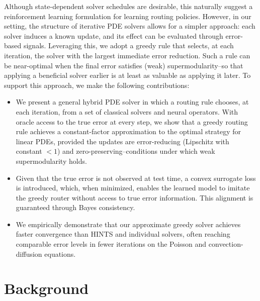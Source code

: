 \documentclass{article}
\newcommand{\ambuj}[1]{\textcolor{red}{AT: #1}}
\begin{document}
Although state-dependent solver schedules are desirable, this naturally suggest a reinforcement learning formulation for learning routing policies. However, in our setting, the structure of iterative PDE solvers allows for a simpler approach: each solver induces a known update, and its effect can be evaluated through error-based signals.
Leveraging this, we adopt a greedy rule that selects, at each iteration, the solver with the largest immediate error reduction.
Such a rule can be near-optimal when the final error satisfies (weak) supermodularity--so that applying a beneficial solver earlier is at least as valuable as applying it later. To support this approach, we make the following contributions:
\begin{itemize}
    \item We present a general hybrid PDE solver in which a routing rule chooses, at each iteration, from a set of classical solvers and neural operators. With oracle access to the true error at every step, we show that a greedy routing rule
    achieves a constant-factor approximation to the optimal strategy for linear PDEs, provided the updates are error-reducing (Lipschitz with constant $<1$) and zero-preserving--conditions under which weak supermodularity holds.
    \item  Given that the true error is not observed at test time, a convex surrogate loss is introduced, which, when minimized, enables the learned model to imitate the greedy router without access to true error information. This alignment is guaranteed through Bayes consistency.
    \item We empirically demonstrate that our approximate greedy solver achieves faster convergence than HINTS and individual solvers, often reaching comparable error levels in fewer iterations on the Poisson and convection-diffusion equations.
\end{itemize}

\section{Background} \label{sec:background}
\end{document}
